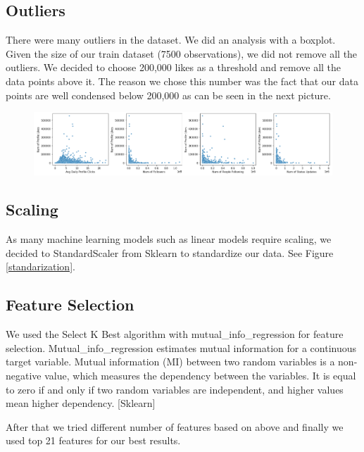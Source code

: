 \documentclass[sigplan,screen]{acmart}
\begin{document}
\subsection{Outliers}
There were  many outliers in the dataset. We did an analysis with a boxplot. Given the size of our train dataset (7500 observations), we did not  remove all the outliers. We decided to choose 200,000 likes as a threshold and remove all the data points above it. The reason we chose this number was the fact that our data points are well condensed below 200,000 as can be seen in the next picture. 
\begin{figure}[H]
\centering
\includegraphics[width=\columnwidth]{scatter.png}
\end{figure}

\subsection{Scaling}
As many machine learning models such as linear models require scaling, we decided to StandardScaler from Sklearn to standardize our data. See Figure \ref{standarization}.


\subsection{Feature Selection}
We used the Select K Best algorithm with mutual\_info\_regression for feature selection. Mutual\_info\_regression estimates mutual information for a continuous target variable. Mutual information (MI) between two random variables is a non-negative value, which measures the dependency between the variables. It is equal to zero if and only if two random variables are independent, and higher values mean higher dependency. [Sklearn]

\noindent After that we tried different number of features based on above and finally we used top 21 features for our best results.
\end{document}

